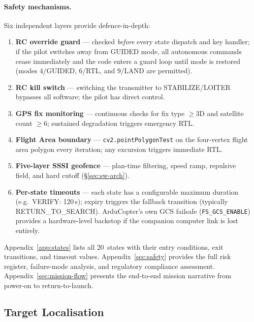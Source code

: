\paragraph{Safety mechanisms.}
Six independent layers provide defence-in-depth:
\begin{enumerate}[nosep]
    \item \textbf{RC override guard} --- checked \emph{before} every state dispatch and key handler; if the pilot switches away from GUIDED mode, all autonomous commands cease immediately and the code enters a guard loop until mode is restored (modes 4/GUIDED, 6/RTL, and 9/LAND are permitted).
    \item \textbf{RC kill switch} --- switching the transmitter to STABILIZE/LOITER bypasses all software; the pilot has direct control.
    \item \textbf{GPS fix monitoring} --- continuous checks for fix type $\geq$3D and satellite count $\geq$6; sustained degradation triggers emergency RTL.
    \item \textbf{Flight Area boundary} --- \texttt{cv2.pointPolygonTest} on the four-vertex flight area polygon every iteration; any excursion triggers immediate RTL.
    \item \textbf{Five-layer SSSI geofence} --- plan-time filtering, speed ramp, repulsive field, and hard cutoff (\S\ref{sec:sw-arch}).
    \item \textbf{Per-state timeouts} --- each state has a configurable maximum duration (e.g.\ VERIFY: 120\,s); expiry triggers the fallback transition (typically RETURN\_TO\_SEARCH). ArduCopter's own GCS failsafe (\texttt{FS\_GCS\_ENABLE}) provides a hardware-level backstop if the companion computer link is lost entirely.
\end{enumerate}
Appendix~\ref{app:states} lists all 20~states with their entry conditions, exit transitions, and timeout values. Appendix~\ref{sec:safety} provides the full risk register, failure-mode analysis, and regulatory compliance assessment. Appendix~\ref{sec:mission-flow} presents the end-to-end mission narrative from power-on to return-to-launch.

\subsection{Target Localisation}\label{sec:localisation}

